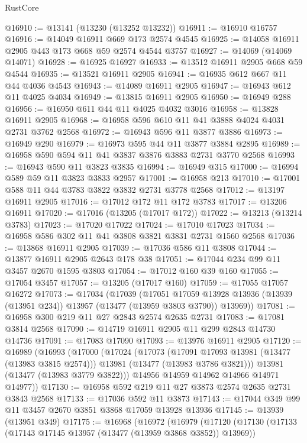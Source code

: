 \begin{lexlean}{RustCore}
\begin{coremodule}
@16910 := @13141 (@13230 (@13252 @13232))
@16911 := @16910 @16757
@16916 := @14049 @16911 @669 @173 @2574 @4545
@16925 := @14058 @16911 @2905 @443 @173 @668 @59 @2574 @4544 @3757
@16927 := @14069 (@14069 @14071)
@16928 := @16925 @16927
@16933 := @13512 @16911 @2905 @668 @59 @4544
@16935 := @13521 @16911 @2905
@16941 := @16935 @612 @667 @11 @44 @4036 @4543
@16943 := @14089 @16911 @2905
@16947 := @16943 @612 @11 @4025 @4034
@16949 := @13815 @16911 @2905
@16950 := @16949 @288
@16956 := @16950 @611 @44 @11 @4025 @4032 @3016
@16958 := @13828 @16911 @2905
@16968 := @16958 @596 @610 @11 @41 @3888 @4024 @4031 @2731 @3762 @2568
@16972 := @16943 @596 @11 @3877 @3886
@16973 := @16949 @290
@16979 := @16973 @595 @44 @11 @3877 @3884 @2895
@16989 := @16958 @590 @594 @11 @41 @3837 @3876 @3883 @2731 @3770 @2568
@16993 := @16943 @590 @11 @3823 @3835
@16994 := @16949 @315
@17000 := @16994 @589 @59 @11 @3823 @3833 @2957
@17001 := @16958 @213
@17010 := @17001 @588 @11 @44 @3783 @3822 @3832 @2731 @3778 @2568
@17012 := @13197 @16911 @2905
@17016 := @17012 @172 @11 @172 @3783
@17017 := @13206 @16911
@17020 := @17016 (@13205 (@17017 @172))
@17022 := @13213 (@13214 @3783)
@17023 := @17020 @17022
@17024 := @17010 @17023
@17034 := @16958 @586 @302 @11 @41 @3808 @3821 @3831 @2731 @1560 @2568
@17036 := @13868 @16911 @2905
@17039 := @17036 @586 @11 @3808
@17044 := @13877 @16911 @2905 @2643 @178 @38
@17051 := @17044 @234 @99 @11 @3457 @2670 @1595 @3803
@17054 := @17012 @160 @39 @160
@17055 := @17054 @3457
@17057 := @13205 (@17017 @160)
@17059 := @17055 @17057 @16272
@17073 := @17034
    (@17039
      (@17051
        @17059
        @13928
        @13936
        (@13939 (@13951 @234))
        @13957
        (@13477 (@13959 @3803 @3790))
        @13969))
@17081 := @16958 @300 @219 @11 @27 @2843 @2574 @2635 @2731
@17083 := @17081 @3814 @2568
@17090 := @14719 @16911 @2905 @11 @299 @2843 @14730 @14736
@17091 := @17083 @17090
@17093 := @13976 @16911 @2905
@17120 := @16989
    (@16993
      (@17000
        (@17024
          (@17073
            (@17091 @17093 @13981 (@13477 (@13983 @3815 @2574)))
            @13981
            (@13477 (@13983 @3786 @3821)))
          @13981
          (@13477 (@13983 @3779 @3822)))
        @14956
        @14959
        @14962
        @14966
        @14971
        @14977))
@17130 := @16958 @592 @219 @11 @27 @3873 @2574 @2635 @2731 @3843 @2568
@17133 := @17036 @592 @11 @3873
@17143 := @17044 @349 @99 @11 @3457 @2670 @3851 @3868 @17059 @13928 @13936
@17145 := @13939 (@13951 @349)
@17175 := @16968
    (@16972
      (@16979
        (@17120
          (@17130
            (@17133 (@17143 @17145 @13957 (@13477 (@13959 @3868 @3852)) @13969))

\end{coremodule}
\end{lexlean}
